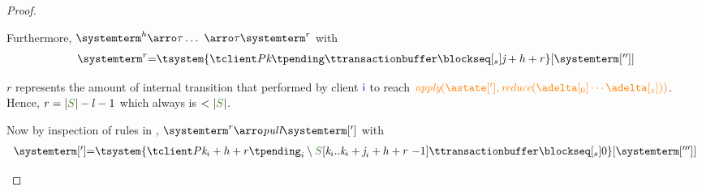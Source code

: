 \begin{proof}
\begin{itemize}
\begin{itemize}
				Furthermore,
				$\systemterm^{h} \arroi{\tau} \ldots\ \arroi{\tau} \systemterm^{r}$ with
				\[\begin{array}{r@{=}l}
					\systemterm^{r} &  \tsystem{\tclienti{\tprogram}{\tknown}{\tpending}{\ttransactionbuffer}{\tsent}{\treceivebuffer + h + r}}[{\systemterm['']}] \\
				  \end{array}		
				\]
				
				$r$ represents the amount of internal transition that performed by client $\textcolor{blue}{{\sf i}}$ to reach $\iapply{\astate[']}{\ireduce{\adelta[_0]\cdots\adelta[_{z}]}}$. Hence, $r =  |\queuemessage| - l - 1$ which always is $< |\queuemessage|$.   
		
				
				
				
	

				
				Now by inspection of rules in \figref{}, 
				$\systemterm^{r} \arroi{\pulltran} \systemterm[']$ with
				\[\begin{array}{r@{=}l}
					\systemterm['] &  \tsystem{\tclienti{\tprogram}{\tknown_i+h+r}{\tpending_i \setminus \queuemessage[\tknown_i .. \tknown_i + \treceivebuffer_i + h + r {\ -1}]}{\ttransactionbuffer}{\tsent}{0}}[{\systemterm[''']}]	
				  \end{array}		
				\]
				
			
				

\end{itemize}
\end{itemize}
\end{proof}
